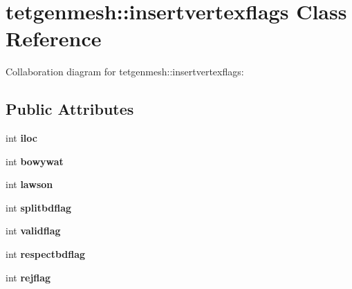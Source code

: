\hypertarget{classtetgenmesh_1_1insertvertexflags}{}\section{tetgenmesh\+:\+:insertvertexflags Class Reference}
\label{classtetgenmesh_1_1insertvertexflags}


Collaboration diagram for tetgenmesh\+:\+:insertvertexflags\+:
\subsection*{Public Attributes}
\begin{DoxyCompactItemize}
\item 
\mbox{\label{classtetgenmesh_1_1insertvertexflags_a6d81dd1549cf9d39ce289d674ce68f45}} 
int {\bfseries iloc}
\item 
\mbox{\label{classtetgenmesh_1_1insertvertexflags_a9b0fa5e802abd84a76e7e24c2dd448ac}} 
int {\bfseries bowywat}
\item 
\mbox{\label{classtetgenmesh_1_1insertvertexflags_a932694f9cfa9b5a20d3ee632c5cb4f0b}} 
int {\bfseries lawson}
\item 
\mbox{\label{classtetgenmesh_1_1insertvertexflags_a38c4259fdc1e73ee994d4bd424e32b2e}} 
int {\bfseries splitbdflag}
\item 
\mbox{\label{classtetgenmesh_1_1insertvertexflags_a22ee846cb6922a83892692ed5a31c632}} 
int {\bfseries validflag}
\item 
\mbox{\label{classtetgenmesh_1_1insertvertexflags_ae953afe4a3a59188b59fabe96cfe1d47}} 
int {\bfseries respectbdflag}
\item 
\mbox{\label{classtetgenmesh_1_1insertvertexflags_af0c3e729085371144fd64069dc88d0ca}} 
int {\bfseries rejflag}
\item 
\mbox{\label{classtetgenmesh_1_1insertvertexflags_a5751fba3e53f3be9d826f9fc96b180a4}} 

\end{DoxyCompactItemize}
